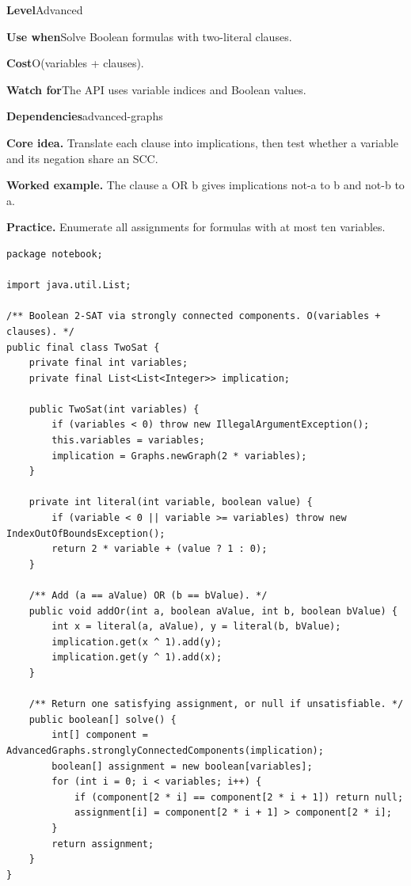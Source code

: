 \documentclass[10pt,letterpaper]{article}
\newcommand{\entrylabel}[1]{\textcolor{accent}{\bfseries #1}}
\begin{document}
\begin{guidebox}\small
\entrylabel{Level}\quad Advanced\par
\entrylabel{Use when}\quad Solve Boolean formulas with two-literal clauses.\par
\entrylabel{Cost}\quad O(variables + clauses).\par
\entrylabel{Watch for}\quad The API uses variable indices and Boolean values.\par
\entrylabel{Dependencies}\quad advanced-graphs\par
\end{guidebox}
\noindent\textbf{Core idea.} Translate each clause into implications, then test whether a variable and its negation share an SCC.\par
\noindent\textbf{Worked example.} The clause a OR b gives implications not-a to b and not-b to a.\par
\noindent\textbf{Practice.} Enumerate all assignments for formulas with at most ten variables.\par
\begin{lstlisting}
package notebook;

import java.util.List;

/** Boolean 2-SAT via strongly connected components. O(variables + clauses). */
public final class TwoSat {
    private final int variables;
    private final List<List<Integer>> implication;

    public TwoSat(int variables) {
        if (variables < 0) throw new IllegalArgumentException();
        this.variables = variables;
        implication = Graphs.newGraph(2 * variables);
    }

    private int literal(int variable, boolean value) {
        if (variable < 0 || variable >= variables) throw new IndexOutOfBoundsException();
        return 2 * variable + (value ? 1 : 0);
    }

    /** Add (a == aValue) OR (b == bValue). */
    public void addOr(int a, boolean aValue, int b, boolean bValue) {
        int x = literal(a, aValue), y = literal(b, bValue);
        implication.get(x ^ 1).add(y);
        implication.get(y ^ 1).add(x);
    }

    /** Return one satisfying assignment, or null if unsatisfiable. */
    public boolean[] solve() {
        int[] component = AdvancedGraphs.stronglyConnectedComponents(implication);
        boolean[] assignment = new boolean[variables];
        for (int i = 0; i < variables; i++) {
            if (component[2 * i] == component[2 * i + 1]) return null;
            assignment[i] = component[2 * i + 1] > component[2 * i];
        }
        return assignment;
    }
}
\end{lstlisting}
\end{document}
